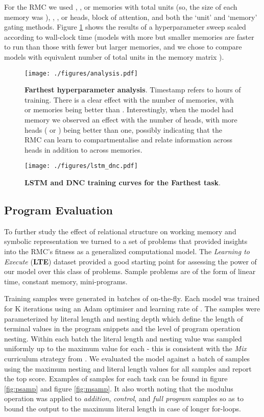 \documentclass{article}
\begin{document}
For the RMC we used , , or  memories with  total units (so, the size of each memory was ), , , or  heads,  block of attention, and both the `unit' and `memory' gating methods. Figure \ref{fig:hp_analysis} shows the results of a hyperparameter sweep scaled according to wall-clock time (models with more but smaller memories are faster to run than those with fewer but larger memories, and we chose to compare models with equivalent number of total units in the memory matrix ). 

\begin{figure}[h]
    \centering
    \texttt{[image: ./figures/analysis.pdf]}
    \caption{\textbf{ Farthest hyperparameter analysis}. Timestamp refers to hours of training. There is a clear effect with the number of memories, with  or  memories being better than . Interestingly, when the model had  memory we observed an effect with the number of heads, with more heads ( or ) being better than one, possibly indicating that the RMC can learn to compartmentalise and relate information across heads in addition to across memories.}
    \label{fig:hp_analysis}
\end{figure}

\begin{figure}
    \centering
    \texttt{[image: ./figures/lstm\_dnc.pdf]}
    \caption{\textbf{LSTM and DNC training curves for the  Farthest task}. }
    \label{fig:lstm_dnc}
\end{figure}

\subsection{Program Evaluation}
To further study the effect of relational structure on working memory and symbolic representation we turned to a set of problems that provided insights into the RMC's fitness as a generalized computational model.  The \textit{Learning to Execute} (\textbf{LTE}) dataset \cite{zaremba2014lte} provided a good starting point for assessing the power of our model over this class of problems.  Sample problems are of the form of linear time, constant memory, mini-programs.

Training samples were generated in batches of  on-the-fly. Each model was trained for K iterations using an Adam optimiser and learning rate of . The samples were parameterized by literal length and nesting depth which define the length of terminal values in the program snippets and the level of program operation nesting. Within each batch the literal length and nesting value was sampled uniformly up to the maximum value for each - this is consistent with the \textit{Mix} curriculum strategy from \cite{zaremba2014lte}. We evaluated the model against a batch of  samples using the maximum nesting and literal length values for all samples and report the top score.  Examples of samples for each task can be found in figure \ref{fig:psamp} and figure \ref{fig:msamp}.  It also worth noting that the modulus operation was applied to \textit{addition}, \textit{control}, and \textit{full program} samples so as to bound the output to the maximum literal length in case of longer for-loops.
\end{document}
